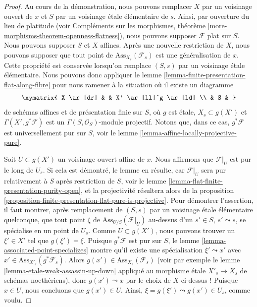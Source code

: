 \begin{proof}
Au cours de la démonstration, nous pouvons remplacer $X$ par un voisinage ouvert de $x$
et $S$ par un voisinage \'etale élémentaire de $s$.
Ainsi, par ouverture du lieu de platitude (voir
Compléments sur les morphismes, théorème \ref{more-morphisms-theorem-openness-flatness}),
nous pouvons supposer $\mathcal{F}$ plat sur $S$.
Nous pouvons supposer $S$ et $X$ affines.
Après une nouvelle restriction de $X$, nous pouvons supposer que tout
point de $\text{Ass}_{X_s}(\mathcal{F}_s)$ est une généralisation de $x$.
Cette propriété est conservée lorsqu'on remplace $(S, s)$ par un voisinage
\'etale élémentaire. Nous pouvons donc appliquer le
lemme \ref{lemma-finite-presentation-flat-along-fibre}
pour nous ramener à la situation où il existe un diagramme
$$
\xymatrix{
X \ar[dr] & & X' \ar[ll]^g \ar[ld] \\
& S &
}
$$
de schémas affines et de présentation finie sur $S$,
où $g$ est \'etale, $X_s \subset g(X')$ et
$\Gamma(X', g^*\mathcal{F})$ est un $\Gamma(S, \mathcal{O}_S)$-module projectif.
Notons que, dans ce cas, $g^*\mathcal{F}$ est universellement pur sur $S$, voir le
lemme \ref{lemma-affine-locally-projective-pure}.

\medskip\noindent
Soit $U \subset g(X')$ un voisinage ouvert affine de $x$.
Nous affirmons que $\mathcal{F}|_U$ est pur le long de $U_s$. Si cela est démontré,
le lemme en résulte, car $\mathcal{F}|_U$ sera pur relativement à $S$
après restriction de $S$, voir le
lemme \ref{lemma-flat-finite-presentation-purity-open},
et la projectivité résultera alors de la
proposition \ref{proposition-finite-presentation-flat-pure-is-projective}.
Pour démontrer l'assertion, il faut montrer, après remplacement de $(S, s)$
par un voisinage \'etale élémentaire quelconque, que tout point $\xi$ de
$\text{Ass}_{U/S}(\mathcal{F}|_U)$ au-dessus d'un
$s' \in S$, $s' \leadsto s$, se spécialise en un point de $U_s$.
Comme $U \subset g(X')$, nous pouvons trouver un $\xi' \in X'$ tel que
$g(\xi') = \xi$. Puisque $g^*\mathcal{F}$ est pur sur $S$, le
lemme \ref{lemma-associated-point-specializes}
montre qu'il existe une spécialisation $\xi' \leadsto x'$ avec
$x' \in \text{Ass}_{X'_s}(g^*\mathcal{F}_s)$. Alors
$g(x') \in \text{Ass}_{X_s}(\mathcal{F}_s)$ (voir par exemple le
lemme \ref{lemma-etale-weak-assassin-up-down}
appliqué au morphisme \'etale $X'_s \to X_s$ de schémas noethériens),
donc $g(x') \leadsto x$ par le choix de $X$ ci-dessus ! Puisque
$x \in U$, nous concluons que $g(x') \in U$. Ainsi,
$\xi = g(\xi') \leadsto g(x') \in U_s$, comme voulu.
\end{proof}

